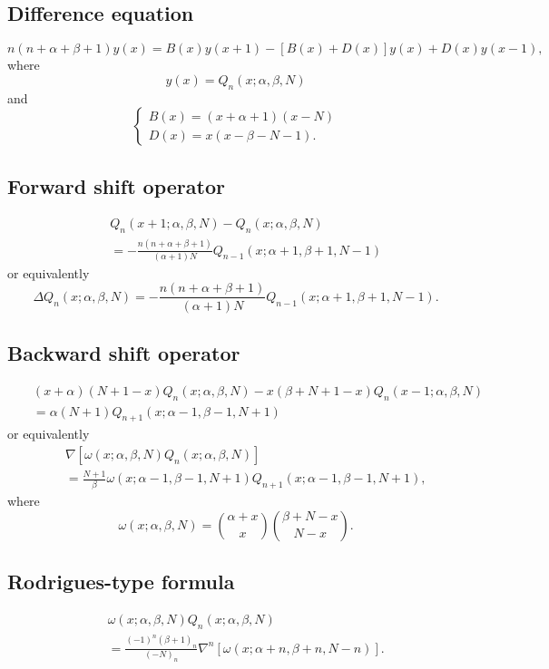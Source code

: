 \documentclass[envcountchap,graybox]{svmono}
\begin{document}
\subsection*{Difference equation}
\begin{equation}
\label{dvHahn}
n(n+\alpha+\beta+1)y(x)=B(x)y(x+1)-\left[B(x)+D(x)\right]y(x)+D(x)y(x-1),
\end{equation}
where
$$y(x)=Q_n(x;\alpha,\beta,N)$$
and
$$\left\{\begin{array}{l}
\displaystyle B(x)=(x+\alpha+1)(x-N)\\[5mm]
\displaystyle D(x)=x(x-\beta-N-1).
\end{array}\right.$$

\subsection*{Forward shift operator}
\begin{eqnarray}
\label{shift1HahnI}
& &Q_n(x+1;\alpha,\beta,N)-Q_n(x;\alpha,\beta,N)\nonumber\\
& &{}=-\frac{n(n+\alpha+\beta+1)}{(\alpha+1)N}Q_{n-1}(x;\alpha+1,\beta+1,N-1)
\end{eqnarray}
or equivalently
\begin{equation}
\label{shift1HahnII}
\Delta Q_n(x;\alpha,\beta,N)=-\frac{n(n+\alpha+\beta+1)}{(\alpha+1)N}Q_{n-1}(x;\alpha+1,\beta+1,N-1).
\end{equation}

\subsection*{Backward shift operator}
\begin{eqnarray}
\label{shift2HahnI}
& &(x+\alpha)(N+1-x)Q_n(x;\alpha,\beta,N)-x(\beta+N+1-x)Q_n(x-1;\alpha,\beta,N)\nonumber\\
& &{}=\alpha(N+1)Q_{n+1}(x;\alpha-1,\beta-1,N+1)
\end{eqnarray}
or equivalently
\begin{eqnarray}
\label{shift2HahnII}
& &\nabla\left[\omega(x;\alpha,\beta,N)Q_n(x;\alpha,\beta,N)\right]\nonumber\\
& &{}=\frac{N+1}{\beta}\omega(x;\alpha-1,\beta-1,N+1)Q_{n+1}(x;\alpha-1,\beta-1,N+1),
\end{eqnarray}
where
$$\omega(x;\alpha,\beta,N)=\binom{\alpha+x}{x}\binom{\beta+N-x}{N-x}.$$

\subsection*{Rodrigues-type formula}
\begin{eqnarray}
\label{RodHahn}
& &\omega(x;\alpha,\beta,N)Q_n(x;\alpha,\beta,N)\nonumber\\
& &{}=\frac{(-1)^n(\beta+1)_n}{(-N)_n}\nabla^n\left[\omega(x;\alpha+n,\beta+n,N-n)\right].
\end{eqnarray}
\end{document}
